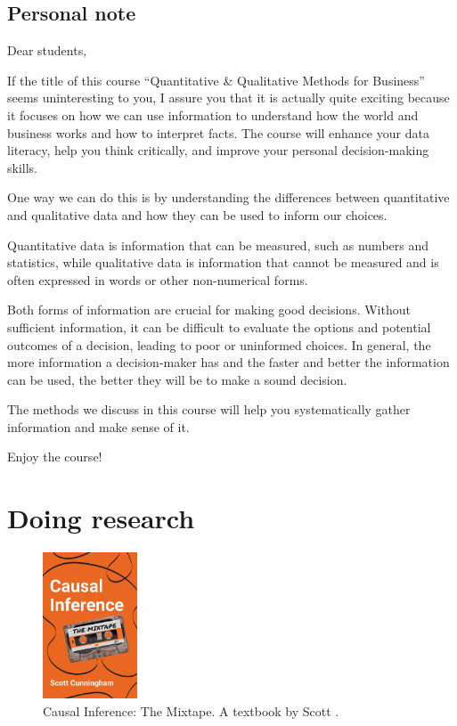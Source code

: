 \documentclass[
  12pt,
  oneside]{book}
\theoremstyle{definition}
\theoremstyle{definition}
\theoremstyle{definition}
\theoremstyle{definition}
\theoremstyle{remark}
\begin{document}
\hypertarget{personal-note}{%
\section*{Personal note}\label{personal-note}}

Dear students,

If the title of this course ``Quantitative \& Qualitative Methods for Business'' seems uninteresting to you, I assure you that it is actually quite exciting because it focuses on how we can use information to understand how the world and business works and how to interpret facts. The course will enhance your data literacy, help you think critically, and improve your personal decision-making skills.

One way we can do this is by understanding the differences between quantitative and qualitative data and how they can be used to inform our choices.

Quantitative data is information that can be measured, such as numbers and statistics, while qualitative data is information that cannot be measured and is often expressed in words or other non-numerical forms.

Both forms of information are crucial for making good decisions. Without sufficient information, it can be difficult to evaluate the options and potential outcomes of a decision, leading to poor or uninformed choices. In general, the more information a decision-maker has and the faster and better the information can be used, the better they will be to make a sound decision.

The methods we discuss in this course will help you systematically gather information and make sense of it.

Enjoy the course!

\hypertarget{doing-research}{%
\chapter{Doing research}\label{doing-research}}

\begin{figure}
\centering
\includegraphics[width=0.25\textwidth,height=\textheight]{fig/cover-ci.jpg}
\caption{\label{fig:ci-book} Causal Inference: The Mixtape. A textbook by Scott \citet{Cunningham2021Causal}.}
\end{figure}
\end{document}
